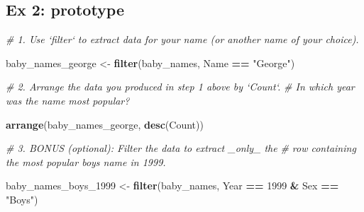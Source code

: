 \documentclass[]{book}
\newenvironment{Shaded}{\begin{snugshade}}{\end{snugshade}}
\newcommand{\KeywordTok}[1]{\textcolor[rgb]{0.13,0.29,0.53}{\textbf{#1}}}
\newcommand{\DecValTok}[1]{\textcolor[rgb]{0.00,0.00,0.81}{#1}}
\newcommand{\StringTok}[1]{\textcolor[rgb]{0.31,0.60,0.02}{#1}}
\newcommand{\CommentTok}[1]{\textcolor[rgb]{0.56,0.35,0.01}{\textit{#1}}}
\newcommand{\OperatorTok}[1]{\textcolor[rgb]{0.81,0.36,0.00}{\textbf{#1}}}
\newcommand{\NormalTok}[1]{#1}
\begin{document}
\subsection{Ex 2: prototype}\label{ex-2-prototype}

\begin{Shaded}
\begin{Highlighting}[]
\CommentTok{# 1.  Use `filter` to extract data for your name (or another name of your choice).  }
\end{Highlighting}
\end{Shaded}

\begin{Shaded}
\begin{Highlighting}[]
\NormalTok{baby_names_george <-}\StringTok{ }\KeywordTok{filter}\NormalTok{(baby_names, Name }\OperatorTok{==}\StringTok{ "George"}\NormalTok{)}
\end{Highlighting}
\end{Shaded}

\begin{Shaded}
\begin{Highlighting}[]
\CommentTok{# 2.  Arrange the data you produced in step 1 above by `Count`. }
\CommentTok{#     In which year was the name most popular?}
\end{Highlighting}
\end{Shaded}

\begin{Shaded}
\begin{Highlighting}[]
\KeywordTok{arrange}\NormalTok{(baby_names_george, }\KeywordTok{desc}\NormalTok{(Count))}
\end{Highlighting}
\end{Shaded}

\begin{Shaded}
\begin{Highlighting}[]
\CommentTok{# 3.  BONUS (optional): Filter the data to extract _only_ the }
\CommentTok{#     row containing the most popular boys name in 1999.}
\end{Highlighting}
\end{Shaded}

\begin{Shaded}
\begin{Highlighting}[]
\NormalTok{baby_names_boys_}\DecValTok{1999}\NormalTok{ <-}\StringTok{ }\KeywordTok{filter}\NormalTok{(baby_names, }
\NormalTok{                    Year }\OperatorTok{==}\StringTok{ }\DecValTok{1999} \OperatorTok{&}\StringTok{ }\NormalTok{Sex }\OperatorTok{==}\StringTok{ "Boys"}\NormalTok{)}
\end{Highlighting}
\end{Shaded}
\end{document}
